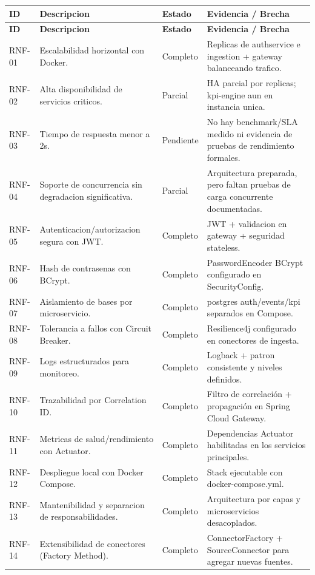 \documentclass[12pt,a4paper]{article}
\begin{document}
\begin{longtable}{p{1.5cm}p{6.4cm}p{2.3cm}p{3.6cm}}
\toprule
\textbf{ID} & \textbf{Descripcion} & \textbf{Estado} & \textbf{Evidencia / Brecha} \\
\midrule
\endfirsthead
\toprule
\textbf{ID} & \textbf{Descripcion} & \textbf{Estado} & \textbf{Evidencia / Brecha} \\
\midrule
\endhead
RNF-01 & Escalabilidad horizontal con Docker. & Completo & Replicas de authservice e ingestion + gateway balanceando trafico. \\
RNF-02 & Alta disponibilidad de servicios criticos. & Parcial & HA parcial por replicas; kpi-engine aun en instancia unica. \\
RNF-03 & Tiempo de respuesta menor a 2s. & Pendiente & No hay benchmark/SLA medido ni evidencia de pruebas de rendimiento formales. \\
RNF-04 & Soporte de concurrencia sin degradacion significativa. & Parcial & Arquitectura preparada, pero faltan pruebas de carga concurrente documentadas. \\
RNF-05 & Autenticacion/autorizacion segura con JWT. & Completo & JWT + validacion en gateway + seguridad stateless. \\
RNF-06 & Hash de contrasenas con BCrypt. & Completo & PasswordEncoder BCrypt configurado en SecurityConfig. \\
RNF-07 & Aislamiento de bases por microservicio. & Completo & postgres auth/events/kpi separados en Compose. \\
RNF-08 & Tolerancia a fallos con Circuit Breaker. & Completo & Resilience4j configurado en conectores de ingesta. \\
RNF-09 & Logs estructurados para monitoreo. & Completo & Logback + patron consistente y niveles definidos. \\
RNF-10 & Trazabilidad por Correlation ID. & Completo & Filtro de correlación + propagación en Spring Cloud Gateway. \\
RNF-11 & Metricas de salud/rendimiento con Actuator. & Completo & Dependencias Actuator habilitadas en los servicios principales. \\
RNF-12 & Despliegue local con Docker Compose. & Completo & Stack ejecutable con docker-compose.yml. \\
RNF-13 & Mantenibilidad y separacion de responsabilidades. & Completo & Arquitectura por capas y microservicios desacoplados. \\
RNF-14 & Extensibilidad de conectores (Factory Method). & Completo & ConnectorFactory + SourceConnector para agregar nuevas fuentes. \\

\end{longtable}
\end{document}
